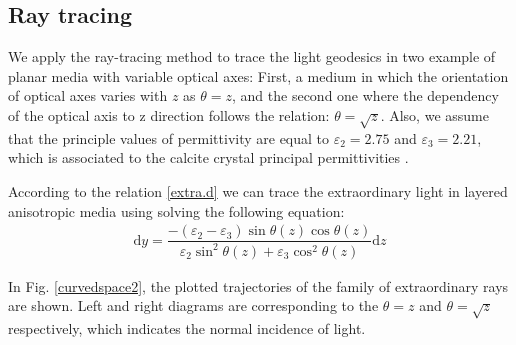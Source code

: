 \documentclass[9pt,twocolumn,twoside]{osajnl}
\begin{document}
\subsection{Ray tracing}
We apply the ray-tracing method to trace the light geodesics in two example of planar media with variable optical axes:
First, a medium in which the orientation of optical axes varies with $z$ as $\theta=z$, and the second one where the dependency of the optical axis to z direction follows the relation: $\theta=\sqrt{z}$. Also, we assume that the principle values of permittivity are equal to  $\varepsilon_{2}=2.75$ and $\varepsilon_{3}=2.21$, which is associated to the calcite crystal principal permittivities \cite{yariv1984optical}. 
 
 According to the relation {\ref{extra.d}} we can trace the extraordinary light in layered anisotropic media using solving the following equation:
 \begin{eqnarray}
\mathrm{d}{y}=\dfrac{-(\varepsilon_{2}-\varepsilon_{3})\sin{\theta(z)}\cos{\theta(z)}}{\varepsilon_{2} \sin^{2}{\theta(z)} + \varepsilon_{3}\cos^{2}{\theta(z)}}\mathrm{d}{z}
\end{eqnarray}
 
   In Fig. \ref{curvedspace2}, the plotted trajectories of the family of extraordinary rays are shown. Left and right diagrams are corresponding to the $\theta=z$ and $\theta=\sqrt{z}$ respectively, which indicates the normal incidence of light. 
\end{document}
